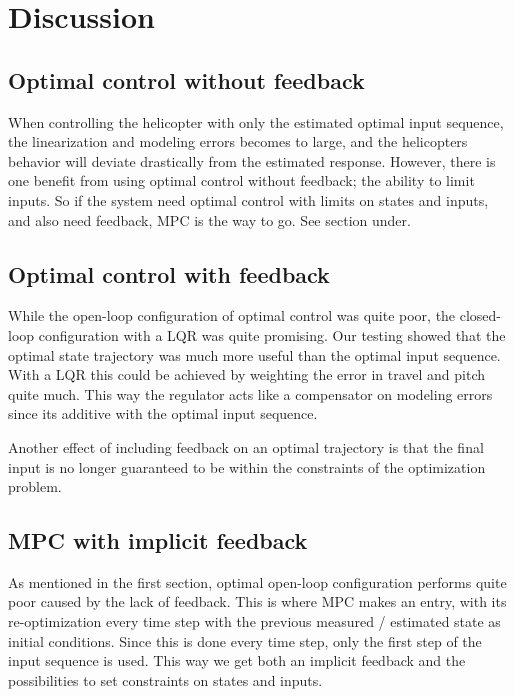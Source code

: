 \section{Discussion}\label{sec:discussion}
\subsection{Optimal control without feedback}
When controlling the helicopter with only the estimated optimal input sequence, the linearization and modeling errors becomes to large, and the helicopters behavior will deviate drastically from the estimated response. However, there is one benefit from using optimal control without feedback; the ability to limit inputs. So if the system need optimal control with limits on states and inputs, and also need feedback, MPC is the way to go. See section under.

\subsection{Optimal control with feedback}
While the open-loop configuration of optimal control was quite poor, the closed-loop configuration with a LQR was quite promising. Our testing showed that the optimal state trajectory was much more useful than the optimal input sequence. With a LQR this could be achieved by weighting the error in travel and pitch quite much. This way the regulator acts like a compensator on modeling errors since its additive with the optimal input sequence.

Another effect of including feedback on an optimal trajectory is that the final input is no longer guaranteed to be within the constraints of the optimization problem.

\subsection{MPC with implicit feedback}
As mentioned in the first section, optimal open-loop configuration performs quite poor caused by the lack of feedback. This is where MPC makes an entry, with its re-optimization every time step with the previous measured / estimated state as initial conditions. Since this is done every time step, only the first step of the input sequence is used. This way we get both an implicit feedback and the possibilities to set constraints on states and inputs. 